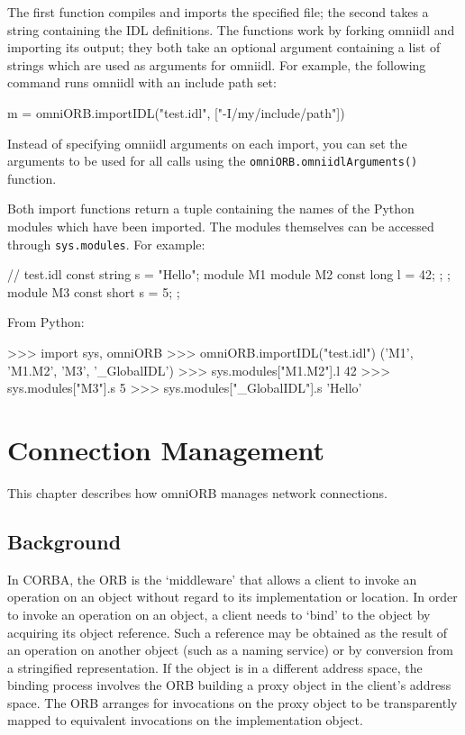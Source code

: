 \documentclass[11pt,twoside,a4paper]{book}
\newcommand{\code}[1]{\texttt{#1}}
\newcommand{\op}[1]{\texttt{#1()}}
\begin{document}
The first function compiles and imports the specified file; the second
takes a string containing the IDL definitions. The functions work by
forking omniidl and importing its output; they both take an optional
argument containing a list of strings which are used as arguments for
omniidl. For example, the following command runs omniidl with an
include path set:

\begin{pylisting}
m = omniORB.importIDL("test.idl", ["-I/my/include/path"])
\end{pylisting}

\noindent Instead of specifying omniidl arguments on each import, you
can set the arguments to be used for all calls using the
\op{omniORB.omniidlArguments} function.

Both import functions return a tuple containing the names of the
Python modules which have been imported. The modules themselves can be
accessed through \code{sys.modules}. For example:

\begin{idllisting}
// test.idl
const string s = "Hello";
module M1 {
  module M2 {
    const long l = 42;
  };
};
module M3 {
  const short s = 5;
};
\end{idllisting}

\noindent From Python:

\begin{pylisting}
>>> import sys, omniORB
>>> omniORB.importIDL("test.idl")
('M1', 'M1.M2', 'M3', '_GlobalIDL')
>>> sys.modules["M1.M2"].l
42
>>> sys.modules["M3"].s
5
>>> sys.modules["_GlobalIDL"].s
'Hello'
\end{pylisting}



\chapter{Connection Management}
\label{ch_conn}


This chapter describes how omniORB manages network connections.

\section{Background}

In CORBA, the ORB is the `middleware' that allows a client to invoke
an operation on an object without regard to its implementation or
location. In order to invoke an operation on an object, a client needs
to `bind' to the object by acquiring its object reference. Such a
reference may be obtained as the result of an operation on another
object (such as a naming service) or by conversion from a stringified
representation. If the object is in a different address space, the
binding process involves the ORB building a proxy object in the
client's address space. The ORB arranges for invocations on the proxy
object to be transparently mapped to equivalent invocations on the
implementation object.
\end{document}
